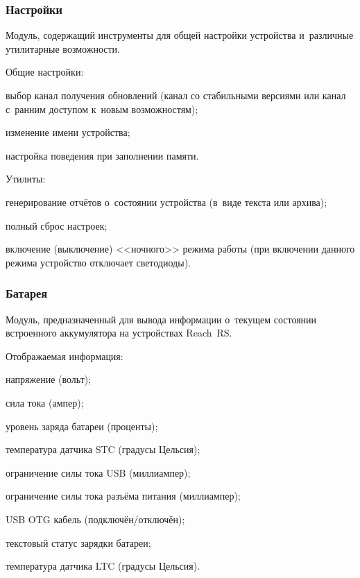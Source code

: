 \subsubsection{Настройки}

Модуль, содержащий инструменты для общей настройки устройства и~различные утилитарные возможности.

Общие настройки:
\begin{dashitemize}
  \item выбор канал получения обновлений (канал со стабильными версиями или канал с~ранним доступом к~новым возможностям);
  \item изменение имени устройства;
  \item настройка поведения при заполнении памяти.
\end{dashitemize}

Утилиты:
\begin{dashitemize}
  \item генерирование отчётов о~состоянии устройства (в~виде текста или архива);
  \item полный сброс настроек;
  \item включение (выключение) <<ночного>> режима работы (при включении данного режима устройство отключает светодиоды).
\end{dashitemize}


\subsubsection{Батарея}

Модуль, предназначенный для вывода информации о~текущем состоянии встроенного аккумулятора на устройствах Reach~RS.

Отображаемая информация:
\begin{dashitemize}
  \item напряжение (вольт);
  \item сила тока (ампер);
  \item уровень заряда батареи (проценты);
  \item температура датчика STC (градусы Цельсия);
  \item ограничение силы тока USB (миллиампер);
  \item ограничение силы тока разъёма питания (миллиампер);
  \item USB OTG кабель (подключён/отключён);
  \item текстовый статус зарядки батареи;
  \item температура датчика LTC (градусы Цельсия).
\end{dashitemize}



